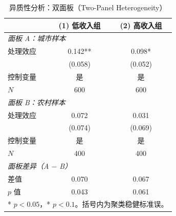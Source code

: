 \begin{table}
  \centering
  \caption{异质性分析：双面板（Two-Panel Heterogeneity）}
  {\footnotesize
  \begin{tabular}{lcc}
    \toprule
    & (1) 低收入组 & (2) 高收入组 \\
    \midrule
    \multicolumn{3}{l}{\textit{面板 A：城市样本}} \\
    \midrule
    处理效应   & 0.142**  & 0.098*   \\
               & (0.058)  & (0.052)  \\
    控制变量   & 是       & 是       \\
    $N$        & 600      & 600      \\
    \midrule
    \multicolumn{3}{l}{\textit{面板 B：农村样本}} \\
    \midrule
    处理效应   & 0.072    & 0.031    \\
               & (0.074)  & (0.069)  \\
    控制变量   & 是       & 是       \\
    $N$        & 400      & 400      \\
    \midrule
    \multicolumn{3}{l}{\textit{面板差异（A $-$ B）}} \\
    \midrule
    差值       & 0.070    & 0.067    \\
    $p$ 值     & 0.043    & 0.061    \\
    \bottomrule
    \multicolumn{3}{l}{%
      \footnotesize ** $p<0.05$，* $p<0.1$。括号内为聚类稳健标准误。}
  \end{tabular}}
\end{table}
